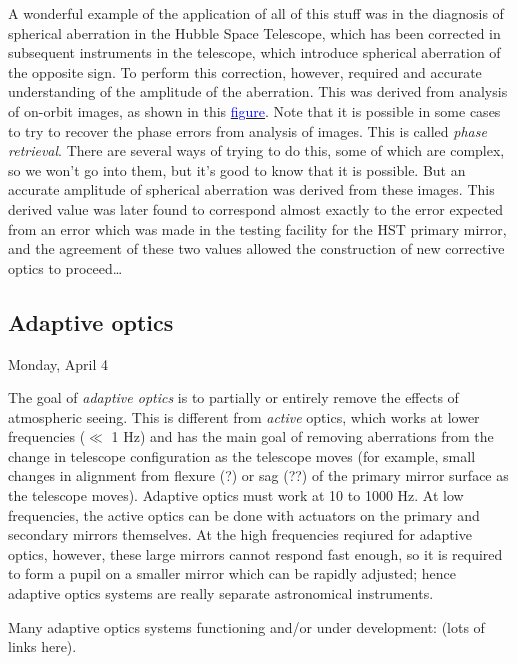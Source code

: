 \documentclass[12pt]{article}
\begin{document}
A wonderful example of the application of all of this stuff was in the
diagnosis of spherical aberration in the Hubble Space Telescope, which
has been corrected in subsequent instruments in the telescope, which
introduce spherical aberration of the opposite sign. To perform this
correction, however, required and accurate understanding of the
amplitude of the aberration. This was derived from analysis of
on-orbit images, as shown in this
\href{http://astronomy.nmsu.edu/holtz/a535/html/diagrams/a535/hstspher.htm}
{\textcolor{blue}{figure}}. Note that it is possible in
some cases to try to recover the phase errors from analysis of images.
This is called \emph{phase retrieval}. There are several ways of trying to do
this, some of which are complex, so we won't go into them, but it's
good to know that it is possible. But an accurate amplitude of
spherical aberration was derived from these images. This derived value
was later found to correspond almost exactly to the error expected
from an error which was made in the testing facility for the HST
primary mirror, and the agreement of these two values allowed the
construction of new corrective optics to proceed\ldots

\subsection{Adaptive optics}
{\small\hfill\textcolor{date}{Monday, April 4}}

The goal of \emph{adaptive optics} is to partially or entirely remove the
effects of atmospheric seeing.
This is different from \emph{active} optics, which works at lower
frequencies ($\ll$ 1 Hz) and has the main goal of removing aberrations
from the change in telescope configuration as the telescope moves
(for example, small changes in alignment from flexure (?) or sag (??)
of the primary mirror surface as the telescope moves).
Adaptive optics must work at 10 to 1000 Hz.
At low frequencies, the active optics can be done
with actuators on the primary and secondary mirrors themselves.
At the high frequencies reqiured for adaptive optics, however, these large
mirrors cannot respond fast enough, so it is required to form a pupil
on a smaller mirror which can be rapidly adjusted;
hence adaptive optics systems are really separate astronomical instruments.

Many adaptive optics systems functioning and/or under development:
(lots of links here).
\end{document}
